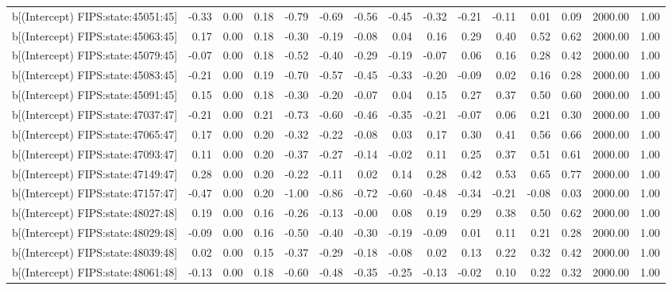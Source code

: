 \begin{table}[ht]
\begin{tabular}{rrrrrrrrrrrrrrr}
  b[(Intercept) FIPS:state:45051:45] & -0.33 & 0.00 & 0.18 & -0.79 & -0.69 & -0.56 & -0.45 & -0.32 & -0.21 & -0.11 & 0.01 & 0.09 & 2000.00 & 1.00 \\ 
  b[(Intercept) FIPS:state:45063:45] & 0.17 & 0.00 & 0.18 & -0.30 & -0.19 & -0.08 & 0.04 & 0.16 & 0.29 & 0.40 & 0.52 & 0.62 & 2000.00 & 1.00 \\ 
  b[(Intercept) FIPS:state:45079:45] & -0.07 & 0.00 & 0.18 & -0.52 & -0.40 & -0.29 & -0.19 & -0.07 & 0.06 & 0.16 & 0.28 & 0.42 & 2000.00 & 1.00 \\ 
  b[(Intercept) FIPS:state:45083:45] & -0.21 & 0.00 & 0.19 & -0.70 & -0.57 & -0.45 & -0.33 & -0.20 & -0.09 & 0.02 & 0.16 & 0.28 & 2000.00 & 1.00 \\ 
  b[(Intercept) FIPS:state:45091:45] & 0.15 & 0.00 & 0.18 & -0.30 & -0.20 & -0.07 & 0.04 & 0.15 & 0.27 & 0.37 & 0.50 & 0.60 & 2000.00 & 1.00 \\ 
  b[(Intercept) FIPS:state:47037:47] & -0.21 & 0.00 & 0.21 & -0.73 & -0.60 & -0.46 & -0.35 & -0.21 & -0.07 & 0.06 & 0.21 & 0.30 & 2000.00 & 1.00 \\ 
  b[(Intercept) FIPS:state:47065:47] & 0.17 & 0.00 & 0.20 & -0.32 & -0.22 & -0.08 & 0.03 & 0.17 & 0.30 & 0.41 & 0.56 & 0.66 & 2000.00 & 1.00 \\ 
  b[(Intercept) FIPS:state:47093:47] & 0.11 & 0.00 & 0.20 & -0.37 & -0.27 & -0.14 & -0.02 & 0.11 & 0.25 & 0.37 & 0.51 & 0.61 & 2000.00 & 1.00 \\ 
  b[(Intercept) FIPS:state:47149:47] & 0.28 & 0.00 & 0.20 & -0.22 & -0.11 & 0.02 & 0.14 & 0.28 & 0.42 & 0.53 & 0.65 & 0.77 & 2000.00 & 1.00 \\ 
  b[(Intercept) FIPS:state:47157:47] & -0.47 & 0.00 & 0.20 & -1.00 & -0.86 & -0.72 & -0.60 & -0.48 & -0.34 & -0.21 & -0.08 & 0.03 & 2000.00 & 1.00 \\ 
  b[(Intercept) FIPS:state:48027:48] & 0.19 & 0.00 & 0.16 & -0.26 & -0.13 & -0.00 & 0.08 & 0.19 & 0.29 & 0.38 & 0.50 & 0.62 & 2000.00 & 1.00 \\ 
  b[(Intercept) FIPS:state:48029:48] & -0.09 & 0.00 & 0.16 & -0.50 & -0.40 & -0.30 & -0.19 & -0.09 & 0.01 & 0.11 & 0.21 & 0.28 & 2000.00 & 1.00 \\ 
  b[(Intercept) FIPS:state:48039:48] & 0.02 & 0.00 & 0.15 & -0.37 & -0.29 & -0.18 & -0.08 & 0.02 & 0.13 & 0.22 & 0.32 & 0.42 & 2000.00 & 1.00 \\ 
  b[(Intercept) FIPS:state:48061:48] & -0.13 & 0.00 & 0.18 & -0.60 & -0.48 & -0.35 & -0.25 & -0.13 & -0.02 & 0.10 & 0.22 & 0.32 & 2000.00 & 1.00 \\ 

\end{tabular}
\end{table}
